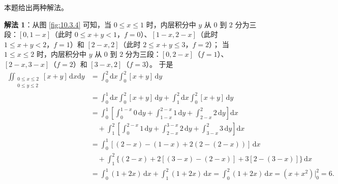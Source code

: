 \begin{figure}[htbp]
\begin{minipage}[b]{0.48\linewidth}
\caption{}\label{fig:10.3.5}
\end{minipage}
\end{figure}

\begin{solution}
本题给出两种解法。

\textbf{解法 1}：从图 \ref{fig:10.3.4} 可知，当 $0 \leqslant x \leqslant 1$ 时，内层积分中 $y$ 从 $0$ 到 $2$ 分为三段：$[0, 1-x]$（此时 $0 \leqslant x+y < 1$，$f=0$）、$[1-x, 2-x]$（此时 $1 \leqslant x+y < 2$，$f=1$）和 $[2-x, 2]$（此时 $2 \leqslant x+y \leqslant 3$，$f=2$）；
当 $1 \leqslant x \leqslant 2$ 时，内层积分中 $y$ 从 $0$ 到 $2$ 分为三段：$[0, 2-x]$（$f=1$）、$[2-x, 3-x]$（$f=2$）和 $[3-x, 2]$（$f=3$）。
于是
\begin{align*}
\iint_{\substack{0 \leqslant x \leqslant 2 \\ 0 \leqslant y \leqslant 2}} [x+y]\,\mathrm{d}x\mathrm{d}y &= \int_0^2 \mathrm{d}x \int_0^2 [x+y]\,\mathrm{d}y \\
&= \int_0^1 \mathrm{d}x \int_0^2 [x+y]\,\mathrm{d}y + \int_1^2 \mathrm{d}x \int_0^2 [x+y]\,\mathrm{d}y \\
&= \int_0^1 \left[ \int_0^{1-x} 0\,\mathrm{d}y + \int_{1-x}^{2-x} 1\,\mathrm{d}y + \int_{2-x}^2 2\,\mathrm{d}y \right] \mathrm{d}x \\
&\quad + \int_1^2 \left[ \int_0^{2-x} 1\,\mathrm{d}y + \int_{2-x}^{3-x} 2\,\mathrm{d}y + \int_{3-x}^2 3\,\mathrm{d}y \right] \mathrm{d}x \\
&= \int_0^1 [(2-x) - (1-x) + 2(2 - (2-x))]\,\mathrm{d}x \\
&\quad + \int_1^2 \{(2-x) + 2[(3-x)-(2-x)] + 3[2-(3-x)]\}\,\mathrm{d}x \\
&= \int_0^1 (1 + 2x)\,\mathrm{d}x + \int_1^2 (1 + 2x)\,\mathrm{d}x = \int_0^2 (1 + 2x)\,\mathrm{d}x = (x + x^2)\Big|_0^2 = 6.
\end{align*}


\end{solution}
